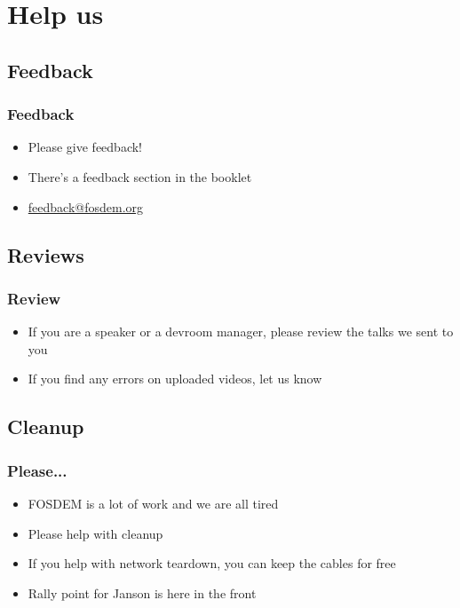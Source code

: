 \documentclass[aspectratio=169]{beamer}
\begin{document}
\section{Help us}

\subsection{Feedback}

\begin{frame}
	\frametitle{Feedback}
	\vfill
	\begin{itemize}
		\item Please give feedback!
		\item There's a feedback section in the booklet
		\item \url{feedback@fosdem.org}
	\end{itemize}
	\vfill
\end{frame}

\subsection{Reviews}

\begin{frame}
	\frametitle{Review}
	\vfill
	\begin{itemize}
		\item If you are a speaker or a devroom manager, please review the talks we sent to you
		\item If you find any errors on uploaded videos, let us know
	\end{itemize}
	\vfill
\end{frame}

\subsection{Cleanup}

\begin{frame}
	\frametitle{Please...}
	\vfill
	\begin{itemize}
		\item FOSDEM is a lot of work and we are all tired
		\item Please help with cleanup
		\item If you help with network teardown, you can keep the cables for free
		\item Rally point for Janson is here in the front
	\end{itemize}
	\vfill
\end{frame}
\end{document}
